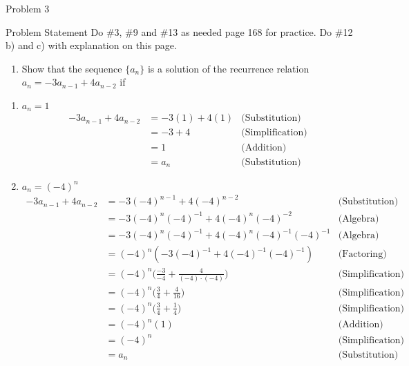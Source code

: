\begin{problem}{Problem 3}
    \begin{statement}{Problem Statement}
        Do \#3, \#9 and \#13 as needed page 168 for practice. Do \#12 b) and c) with explanation on this page.
    \end{statement}

    \begin{highlight}[Solution - \#12]
        \begin{enumerate}[label = \arabic*., start = 12]
            \item Show that the sequence $\{a_{n}\}$ is a solution of the recurrence relation $a_{n} = -3a_{n-1} + 4a_{n-2}$ if
        \end{enumerate}
        
        \begin{enumerate}[label = (\alph*), start = 2]
            \item $a_{n} = 1$
            \begin{align*}
                -3a_{n-1} + 4a_{n-2} & = -3(1) + 4(1) & \text{(Substitution)} \\
                & = -3 + 4 & \text{(Simplification)} \\
                & = 1 & \text{(Addition)} \\
                & = a_{n} & \text{(Substitution)}
            \end{align*}
            \item $a_{n} = (-4)^{n}$
            \begin{align*}
                -3a_{n-1} + 4a_{n-2} & = -3(-4)^{n - 1} + 4(-4)^{n - 2} & \text{(Substitution)} \\
                & = -3(-4)^{n}(-4)^{-1} + 4(-4)^{n}(-4)^{-2} & \text{(Algebra)} \\
                & = -3(-4)^{n}(-4)^{-1} + 4(-4)^{n}(-4)^{-1}(-4)^{-1} & \text{(Algebra)} \\
                & = (-4)^{n}(-3(-4)^{-1} + 4(-4)^{-1}(-4)^{-1}) & \text{(Factoring)} \\
                & = (-4)^{n}\Bigg(\frac{-3}{-4} + \frac{4}{(-4)\cdot(-4)}\Bigg) & \text{(Simplification)} \\
                & = (-4)^{n}\Bigg(\frac{3}{4} + \frac{4}{16}\Bigg) & \text{(Simplification)} \\
                & = (-4)^{n}\Bigg(\frac{3}{4} + \frac{1}{4}\Bigg) & \text{(Simplification)} \\
                & = (-4)^{n}(1) & \text{(Addition)} \\
                & = (-4)^{n} & \text{(Simplification)} \\
                & = a_{n} & \text{(Substitution)}
            \end{align*}
        \end{enumerate}


\end{highlight}
\end{problem}
